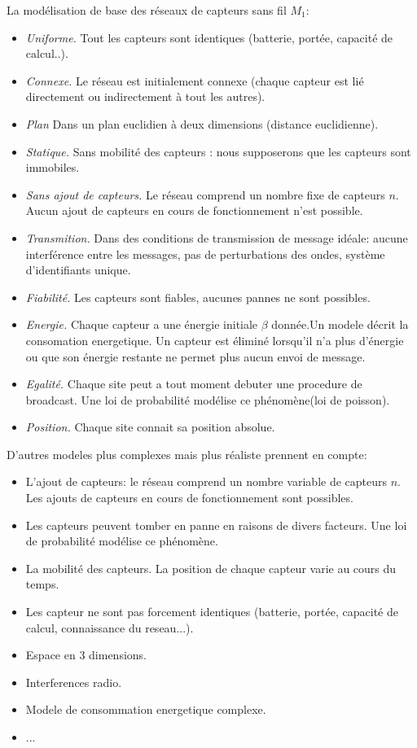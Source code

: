 La modélisation de base des réseaux de capteurs sans fil \textbf{$M_1$}:
\begin{itemize}
 \item \textit{Uniforme.} Tout les capteurs sont identiques (batterie, portée, capacité de calcul..).
 \item \textit{Connexe.} Le réseau est initialement connexe (chaque capteur est lié directement ou indirectement à tout les autres).
 \item \textit{Plan} Dans un plan euclidien à deux dimensions (distance euclidienne).
 \item \textit{Statique.} Sans mobilité des capteurs : nous supposerons que les capteurs sont immobiles.
 \item \textit{Sans ajout de capteurs.} Le réseau comprend un nombre fixe de capteurs $n$. Aucun ajout de capteurs en cours de fonctionnement n'est possible.
 \item \textit{Transmition.} Dans des conditions de transmission de message idéale: aucune interférence entre les messages, pas de perturbations des ondes, système d'identifiants unique.
 \item \textit{Fiabilité.} Les capteurs sont fiables, aucunes pannes ne sont possibles.
 \item \textit{Energie.} Chaque capteur a une énergie initiale $\beta$ donnée.Un modele décrit la consomation energetique. Un capteur est éliminé lorsqu'il n'a plus d'énergie ou que son énergie 
 restante ne permet plus aucun envoi de message. 
 \item \textit{Egalité.} Chaque site peut a tout moment debuter une procedure de broadcast. Une loi de probabilité modélise 
 ce phénomène(loi de poisson).
 \item \textit{Position.} Chaque site connait sa position absolue.  \\
\end{itemize}

  D'autres modeles plus complexes mais plus réaliste prennent en compte:
  
\begin{itemize}
   
 \item L'ajout de capteurs: le réseau comprend un nombre variable de capteurs $n$. Les ajouts de capteurs en cours de fonctionnement sont possibles.
 \item Les capteurs peuvent tomber en panne en raisons de divers facteurs. Une loi de probabilité modélise ce phénomène.   
 \item La mobilité des capteurs. La position de chaque capteur varie au cours du temps.
 \item Les capteur ne sont pas forcement identiques (batterie, portée, capacité de calcul, connaissance du reseau...).
 \item Espace en 3 dimensions.
 \item Interferences radio.
 \item Modele de consommation energetique complexe.
 \item ...
\end{itemize}

